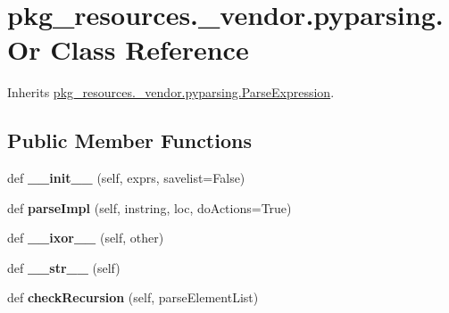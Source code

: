 \hypertarget{classpkg__resources_1_1__vendor_1_1pyparsing_1_1_or}{}\section{pkg\+\_\+resources.\+\_\+vendor.\+pyparsing.\+Or Class Reference}
\label{classpkg__resources_1_1__vendor_1_1pyparsing_1_1_or}


Inherits \hyperlink{classpkg__resources_1_1__vendor_1_1pyparsing_1_1_parse_expression}{pkg\+\_\+resources.\+\_\+vendor.\+pyparsing.\+Parse\+Expression}.

\subsection*{Public Member Functions}
\begin{DoxyCompactItemize}
\item 
\mbox{\label{classpkg__resources_1_1__vendor_1_1pyparsing_1_1_or_a212a05688c290595d8ad7020bcaff634}} 
def {\bfseries \+\_\+\+\_\+init\+\_\+\+\_\+} (self, exprs, savelist=False)
\item 
\mbox{\label{classpkg__resources_1_1__vendor_1_1pyparsing_1_1_or_ad5892cd5acb9b39df835cb1031f05cdf}} 
def {\bfseries parse\+Impl} (self, instring, loc, do\+Actions=True)
\item 
\mbox{\label{classpkg__resources_1_1__vendor_1_1pyparsing_1_1_or_a6a15222b5a1759e4e7a222d1a3e33b88}} 
def {\bfseries \+\_\+\+\_\+ixor\+\_\+\+\_\+} (self, other)
\item 
\mbox{\label{classpkg__resources_1_1__vendor_1_1pyparsing_1_1_or_a3b8a60a0f29fb71fe31a0436d83c8e67}} 
def {\bfseries \+\_\+\+\_\+str\+\_\+\+\_\+} (self)
\item 
\mbox{\label{classpkg__resources_1_1__vendor_1_1pyparsing_1_1_or_ab91469b6c2dca271fb8dd0e5e25acbfd}} 
def {\bfseries check\+Recursion} (self, parse\+Element\+List)
\end{DoxyCompactItemize}
